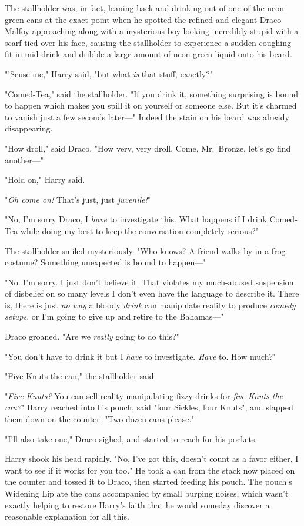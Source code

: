The stallholder was, in fact, leaning back and drinking out of one of the
neon-green cans at the exact point when he spotted the refined and elegant
Draco Malfoy approaching along with a mysterious boy looking incredibly stupid
with a scarf tied over his face, causing the stallholder to experience a sudden
coughing fit in mid-drink and dribble a large amount of neon-green liquid onto
his beard.

"'Scuse me," Harry said, "but what \emph{is} that stuff, exactly?"

"Comed-Tea," said the stallholder. "If you drink it, something surprising is
bound to happen which makes you spill it on yourself or someone else. But it's
charmed to vanish just a few seconds later---" Indeed the stain on his beard
was already disappearing.

"How droll," said Draco. "How very, very droll. Come, Mr.~Bronze, let's go find
another---"

"Hold on," Harry said.

"\emph{Oh come on!} That's just, just \emph{juvenile!}"

"No, I'm sorry Draco, I \emph{have} to investigate this. What happens if I
drink Comed-Tea while doing my best to keep the conversation completely
serious?"

The stallholder smiled mysteriously. "Who knows? A friend walks by in a frog
costume? Something unexpected is bound to happen---"

"No. I'm sorry. I just don't believe it. That violates my much-abused
suspension of disbelief on so many levels I don't even have the language to
describe it. There is, there is just \emph{no way} a bloody \emph{drink} can
manipulate reality to produce \emph{comedy setups}, or I'm going to give up and
retire to the Bahamas---"

Draco groaned. "Are we \emph{really} going to do this?"

"You don't have to drink it but I \emph{have} to investigate. \emph{Have} to.
How much?"

"Five Knuts the can," the stallholder said.

"\emph{Five Knuts?} You can sell reality-manipulating fizzy drinks for
\emph{five Knuts the can?}" Harry reached into his pouch, said "four Sickles,
four Knuts", and slapped them down on the counter. "Two dozen cans please."

"I'll also take one," Draco sighed, and started to reach for his pockets.

Harry shook his head rapidly. "No, I've got this, doesn't count as a favor
either, I want to see if it works for you too." He took a can from the stack
now placed on the counter and tossed it to Draco, then started feeding his
pouch. The pouch's Widening Lip ate the cans accompanied by small burping
noises, which wasn't exactly helping to restore Harry's faith that he would
someday discover a reasonable explanation for all this.

